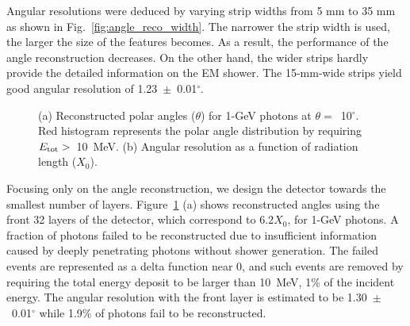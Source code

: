 \documentclass[preprint,12pt,times,a4paper]{elsarticle}
\begin{document}
Angular resolutions were deduced by varying strip widths from 5 mm to 35 mm as shown in Fig.~\ref{fig:angle_reco_width}.  The narrower the strip width is used, the larger the size of the features becomes. As a result, the performance of the angle reconstruction decreases. On the other hand, the wider strips hardly provide the detailed information on the EM shower. The 15-mm-wide strips yield good angular resolution of 1.23~$\pm$~0.01$^{\circ}$.

\begin{figure}[!hbt]
\centering
{}
\caption{ (a) Reconstructed polar angles ($\theta$) for 1-GeV photons at $\theta=$~10$^{\circ}$. Red histogram represents the polar angle distribution by requiring $E_{\rm{tot}}>$~10~MeV. (b) Angular resolution as a function of radiation length ($X_{0}$).}
\label{fig:angle_reco_layer}
\end{figure}

Focusing only on the angle reconstruction, we design the detector towards the smallest number of layers. Figure~\ref{fig:angle_reco_layer} (a) shows reconstructed angles using the front 32 layers of the detector, which correspond to 6.2$X_{0}$, for 1-GeV photons. A fraction of photons failed to be reconstructed due to insufficient information caused by deeply penetrating photons without shower generation. The failed events are represented as a delta function near 0, and such events are removed by requiring the total energy deposit to be larger than 10~MeV, 1\% of the incident energy. The angular resolution with the front layer is estimated to be 1.30~$\pm$~0.01$^{\circ}$ while 1.9\% of photons fail to be reconstructed.
\end{document}
